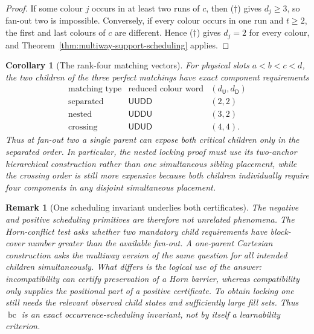 \documentclass[11pt]{article}
\newtheorem{corollary}[definition]{Corollary}
\newtheorem{remark}[definition]{Remark}
\begin{document}
\begin{proof}
If some colour $j$ occurs in at least two runs of $c$, then
\textup{($\dagger$)} gives $d_j\ge3$, so fan-out two is impossible.  Conversely,
if every colour occurs in one run and $t\ge2$, the first and last colours of
$c$ are different.  Hence \textup{($\dagger$)} gives $d_j=2$ for every colour,
and Theorem~\ref{thm:multiway-support-scheduling} applies.
\end{proof}

\begin{corollary}[The rank-four matching vectors]
\label{cor:matching-scheduling-vectors}
For physical slots $a<b<c<d$, the two children of the three perfect matchings
have exact component requirements
\[
\begin{array}{c|c|c}
\text{matching type}&\text{reduced colour word}
 & (d_{\mathsf U},d_{\mathsf D})\\
\hline
\text{separated}&\mathsf U\mathsf U\mathsf D\mathsf D&(2,2)\\
\text{nested}&\mathsf U\mathsf D\mathsf D\mathsf U&(3,2)\\
\text{crossing}&\mathsf U\mathsf D\mathsf U\mathsf D&(4,4).
\end{array}
\]
Thus at fan-out two a single parent can expose both critical children only in
the separated order.  In particular, the nested locking proof must use its
two-anchor hierarchical construction rather than one simultaneous sibling
placement, while the crossing order is still more expensive because both
children individually require four components in any disjoint simultaneous
placement.
\end{corollary}

\begin{remark}[One scheduling invariant underlies both certificates]
The negative and positive scheduling primitives are therefore not unrelated
phenomena.  The Horn-conflict test asks whether two mandatory child
requirements have block-cover number greater than the available fan-out.  A
one-parent Cartesian construction asks the multiway version of the same
question for all intended children simultaneously.  What differs is the
logical use of the answer: incompatibility can certify preservation of a Horn
barrier, whereas compatibility only supplies the positional part of a positive
certificate.  To obtain locking one still needs the relevant observed child
states and sufficiently large fill sets.  Thus
$\operatorname{bc}$ is an exact occurrence-scheduling invariant, not by itself
a learnability criterion.
\end{remark}
\end{document}

